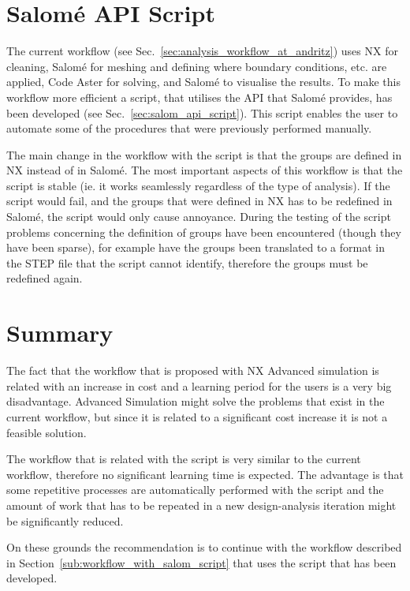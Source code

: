 
\section{Salomé API Script} %
\label{sec:salom_api_script_conclusions}
The current workflow (see Sec.~\ref{sec:analysis_workflow_at_andritz}) uses NX for cleaning, Salomé for meshing and defining where boundary conditions, etc. are applied, Code Aster for solving, and Salomé to visualise the results. To make this workflow more efficient a script, that utilises the API that Salomé provides, has been developed (see Sec.~\ref{sec:salom_api_script}). This script enables the user to automate some of the procedures that were previously performed manually.

The main change in the workflow with the script is that the groups are defined in NX instead of in Salomé. The most important aspects of this workflow is that the script is stable (ie. it works seamlessly regardless of the type of analysis). If the script would fail, and the groups that were defined in NX has to be redefined in Salomé, the script would only cause annoyance. During the testing of the script problems concerning the definition of groups have been encountered (though they have been sparse), for example have the groups been translated to a format in the STEP file that the script cannot identify, therefore the groups must be redefined again.

\section{Summary} %
\label{sec:summary}
The fact that the workflow that is proposed with NX Advanced simulation is related with an increase in cost and a learning period for the users is a very big disadvantage. Advanced Simulation might solve the problems that exist in the current workflow, but since it is related to a significant cost increase it is not a feasible solution.

The workflow that is related with the script is very similar to the current workflow, therefore no significant learning time is expected. The advantage is that some repetitive processes are automatically performed with the script and the amount of work that has to be repeated in a new design-analysis iteration might be significantly reduced.

On these grounds the recommendation is to continue with the workflow described in Section~\ref{sub:workflow_with_salom_script} that uses the script that has been developed.



